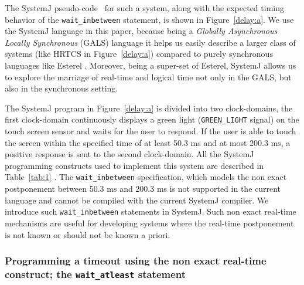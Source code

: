 The SystemJ pseudo-code~\cite{amal10} for such a system, along with the
expected timing behavior of the \texttt{wait\-\_inbetween} statement, is
shown in Figure~\ref{delay:a}. We use the SystemJ language in this
paper, because being a \textit{Globally Asynchronous Locally
Synchronous} (GALS) language it helps us easily describe a larger class
of systems (like HRTCS in Figure~\ref{delay:a}) compared to purely
synchronous languages like Esterel \cite{gber931}. Moreover, being a
super-set of Esterel, SystemJ allows us to explore the marriage of
real-time and logical time not only in the GALS, but also in the
synchronous setting.

The SystemJ program in Figure~\ref{delay:a} is divided into two
 clock-domains, the first clock-domain
continuously displays a green light (\texttt{GREEN\_LIGHT} signal) on
the touch screen sensor and waits for the user to respond. If the user
is able to touch the screen within the specified time of at least 50.3
ms and at most 200.3 ms, a positive response is sent to the second
clock-domain. All the SystemJ programming constructs used to implement
this system are described in Table~\ref{tab:1} . The \texttt{wait\_inbetween}
specification, which models the non exact postponement between 50.3 ms
and 200.3 ms is not supported in the current language and cannot be
compiled with the current SystemJ compiler. We introduce such
\texttt{wait\_inbetween} statements in SystemJ. Such non exact real-time
mechanisms are useful for developing systems where the real-time
postponement is not known or should not be known a priori.

\subsubsection{Programming a timeout using the non exact real-time
  construct; the \texttt{wait\_atleast} statement}
\label{sec:progr-time-using}

